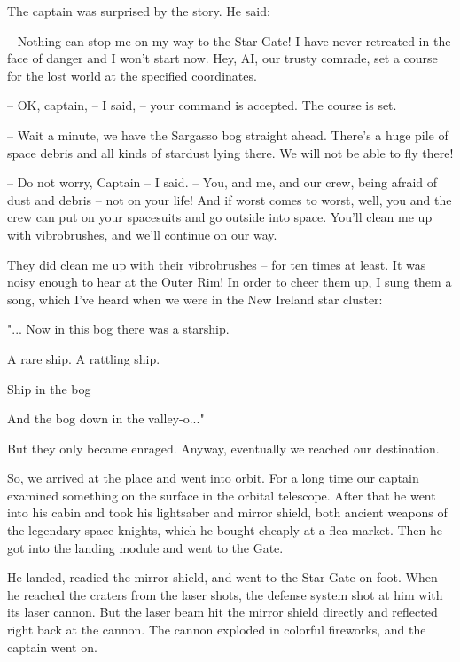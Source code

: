 \documentclass[ebook,twoside,final,openright]{memoir}
\begin{document}
\par
The captain was surprised by the story. He said:\par
– Nothing can stop me on my way to the Star Gate! I have never retreated in the face of danger and I won’t start now. Hey, AI, our trusty comrade, set a course for the lost world at the specified coordinates.\par
– OK, captain, – I said, – your command is accepted. The course is set.\par
– Wait a minute, we have the Sargasso bog straight ahead. There's a huge pile of space debris and all kinds of stardust lying there. We will not be able to fly there!\par
– Do not worry, Captain – I said. – You, and me, and our crew, being afraid of dust and debris – not on your life! And if worst comes to worst, well, you and the crew can put on your spacesuits and go outside into space. You’ll clean me up with vibrobrushes, and we’ll continue on our way.\par
\par
They did clean me up with their vibrobrushes – for ten times at least. It was noisy enough to hear at the Outer Rim! In order to cheer them up, I sung them a song, which I’ve heard when we were in the New Ireland star cluster: \par
"... Now in this bog there was a starship.\par
A rare ship. A rattling ship.\par
Ship in the bog\par
And the bog down in the valley-o..."\par
 But they only became enraged. Anyway, eventually we reached our destination.\par
\par
So, we arrived at the place and went into orbit. For a long time our captain examined something on the surface in the orbital telescope. After that he went into his cabin and took his lightsaber and mirror shield, both ancient weapons of the legendary space knights, which he bought cheaply at a flea market. Then he got into the landing module and went to the Gate.\par
\par
He landed, readied the mirror shield, and went to the Star Gate on foot. When he reached the craters from the laser shots, the defense system shot at him with its laser cannon. But the laser beam hit the mirror shield directly and reflected right back at the cannon. The cannon exploded in colorful fireworks, and the captain went on.\par
\end{document}
